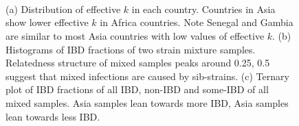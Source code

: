 \documentclass[9pt,lineno]{elife}
\begin{document}
\begin{figure}[htp]
  \centering{}
  \\
  \\
  \\
  \caption{(a) Distribution of effective $k$ in each country. Countries in Asia show lower effective $k$ in Africa countries. Note Senegal and Gambia are similar to most Asia countries with low values of effective $k$. (b) Histograms of IBD fractions of two strain mixture samples. Relatedness structure of mixed samples peaks around 0.25, 0.5 suggest that mixed infections are caused by sib-strains. (c) Ternary plot of IBD fractions of all IBD, non-IBD and some-IBD of all mixed samples. Asia samples lean towards more IBD, Asia samples lean towards less IBD.}
  \label{fig:IBD_frac_hist}
\end{figure}
\end{document}
